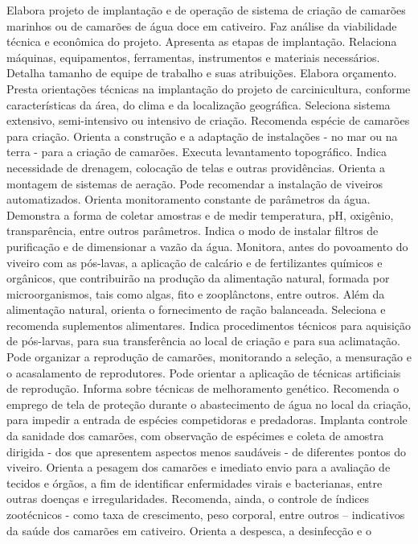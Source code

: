 \documentclass[
]{article}
\begin{document}
Elabora projeto de implantação e de operação de sistema de criação de
camarões marinhos ou de camarões de água doce em cativeiro. Faz análise
da viabilidade técnica e econômica do projeto. Apresenta as etapas de
implantação. Relaciona máquinas, equipamentos, ferramentas, instrumentos
e materiais necessários. Detalha tamanho de equipe de trabalho e suas
atribuições. Elabora orçamento. Presta orientações técnicas na
implantação do projeto de carcinicultura, conforme características da
área, do clima e da localização geográfica. Seleciona sistema extensivo,
semi-intensivo ou intensivo de criação. Recomenda espécie de camarões
para criação. Orienta a construção e a adaptação de instalações - no mar
ou na terra - para a criação de camarões. Executa levantamento
topográfico. Indica necessidade de drenagem, colocação de telas e outras
providências. Orienta a montagem de sistemas de aeração. Pode recomendar
a instalação de viveiros automatizados. Orienta monitoramento constante
de parâmetros da água. Demonstra a forma de coletar amostras e de medir
temperatura, pH, oxigênio, transparência, entre outros parâmetros.
Indica o modo de instalar filtros de purificação e de dimensionar a
vazão da água. Monitora, antes do povoamento do viveiro com as
pós-lavas, a aplicação de calcário e de fertilizantes químicos e
orgânicos, que contribuirão na produção da alimentação natural, formada
por microorganismos, tais como algas, fito e zooplânctons, entre outros.
Além da alimentação natural, orienta o fornecimento de ração balanceada.
Seleciona e recomenda suplementos alimentares. Indica procedimentos
técnicos para aquisição de pós-larvas, para sua transferência ao local
de criação e para sua aclimatação. Pode organizar a reprodução de
camarões, monitorando a seleção, a mensuração e o acasalamento de
reprodutores. Pode orientar a aplicação de técnicas artificiais de
reprodução. Informa sobre técnicas de melhoramento genético. Recomenda o
emprego de tela de proteção durante o abastecimento de água no local da
criação, para impedir a entrada de espécies competidoras e predadoras.
Implanta controle da sanidade dos camarões, com observação de espécimes
e coleta de amostra dirigida - dos que apresentem aspectos menos
saudáveis - de diferentes pontos do viveiro. Orienta a pesagem dos
camarões e imediato envio para a avaliação de tecidos e órgãos, a fim de
identificar enfermidades virais e bacterianas, entre outras doenças e
irregularidades. Recomenda, ainda, o controle de índices zootécnicos -
como taxa de crescimento, peso corporal, entre outros -- indicativos da
saúde dos camarões em cativeiro. Orienta a despesca, a desinfecção e o
\end{document}
